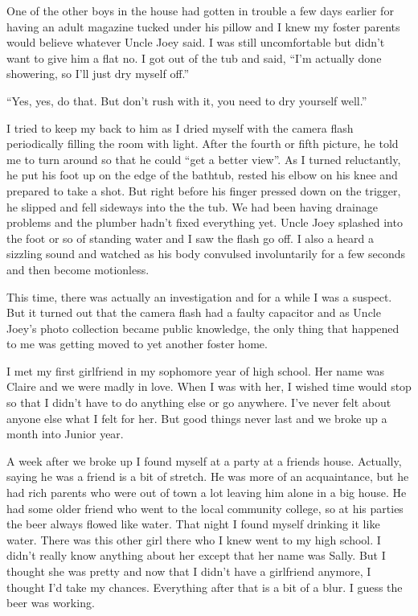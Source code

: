 \documentclass[12pt,letterpaper]{article}
\begin{document}
One of the other boys in the house had gotten in trouble a few days earlier for having an adult magazine tucked under his pillow and I knew my foster parents would believe whatever Uncle Joey said. I was still uncomfortable but didn't want to give him a flat no. I got out of the tub and said, ``I'm actually done showering, so I'll just dry myself off.''

``Yes, yes, do that. But don't rush with it, you need to dry yourself well.''

I tried to keep my back to him as I dried myself with the camera flash periodically filling the room with light. After the fourth or fifth picture, he told me to turn around so that he could ``get a better view''. As I turned reluctantly, he put his foot up on the edge of the bathtub, rested his elbow on his knee and prepared to take a shot. But right before his finger pressed down on the trigger, he slipped and fell sideways into the the tub. We had been having drainage problems and the plumber hadn't fixed everything yet. Uncle Joey splashed into the foot or so of standing water and I saw the flash go off. I also a heard a sizzling sound and watched as his body convulsed involuntarily for a few seconds and then become motionless.

This time, there was actually an investigation and for a while I was a suspect. But it turned out that the camera flash had a faulty capacitor and as Uncle Joey's photo collection became public knowledge, the only thing that happened to me was getting moved to yet another foster home.


I met my first girlfriend in my sophomore year of high school. Her name was Claire and we were madly in love. When I was with her, I wished time would stop so that I didn't have to do anything else or go anywhere. I've never felt about anyone else what I felt for her. But good things never last and we broke up a month into Junior year.

A week after we broke up I found myself at a party at a friends house. Actually, saying he was a friend is a bit of stretch. He was more of an acquaintance, but he had rich parents who were out of town a lot leaving him alone in a big house. He had some older friend who went to the local community college, so at his parties the beer always flowed like water. That night I found myself drinking it like water. There was this other girl there who I knew went to my high school. I didn't really know anything about her except that her name was Sally. But I thought she was pretty and now that I didn't have a girlfriend anymore, I thought I'd take my chances. Everything after that is a bit of a blur. I guess the beer was working.
\end{document}
